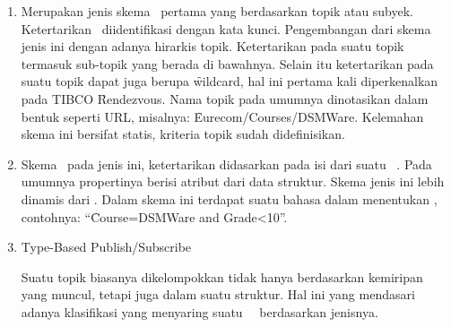 \begin{enumerate}[noitemsep,nolistsep,leftmargin=0cm,itemindent=.5cm,listparindent=\parindent]
    \item \TopicBased 

        Merupakan jenis skema \pubsub~pertama
        yang berdasarkan topik atau subyek. Ketertarikan \subscriber~diidentifikasi
        dengan kata kunci. Pengembangan dari skema jenis ini dengan adanya hirarkis
        topik. Ketertarikan pada suatu topik termasuk sub-topik yang berada di bawahnya.
        Selain itu ketertarikan pada suatu topik dapat juga berupa \f{wildcard}, hal ini
        pertama kali diperkenalkan pada TIBCO \f{Rendezvous}. Nama topik pada umumnya 
        dinotasikan dalam bentuk seperti URL, misalnya: \f{Eurecom/Courses/DSMWare}. 
        Kelemahan skema ini bersifat statis, kriteria topik sudah didefinisikan.
    \item \ContentBased

        Skema \subscription~pada jenis ini, ketertarikan didasarkan pada isi dari 
        suatu \event~\pubsub.
        Pada umumnya propertinya berisi atribut dari data struktur. Skema jenis ini
        lebih dinamis dari \topicbased. Dalam skema ini terdapat
        suatu bahasa dalam menentukan \subscription, contohnya: ``\f{Course=DSMWare and
        Grade\textless10}''.
    \item Type-Based Publish/Subscribe
        
        Suatu topik biasanya dikelompokkan tidak hanya berdasarkan kemiripan yang muncul,
        tetapi juga dalam suatu struktur. Hal ini yang mendasari adanya klasifikasi
        yang menyaring suatu \event~\pubsub~berdasarkan jenisnya. 
\end{enumerate}



